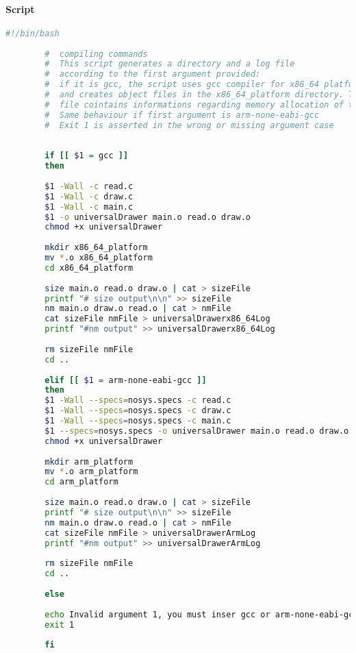 \documentclass{article}
\begin{document}
		\paragraph{Script}
		\begin{center}
		\begin{lstlisting}[language=bash, basicstyle=\small]
		#!/bin/bash
		
		#  compiling commands
		#  This script generates a directory and a log file
		#  according to the first argument provided:
		#  if it is gcc, the script uses gcc compiler for x86_64 platforms
		#  and creates object files in the x86_64_platform directory. The log
		#  file cointains informations regarding memory allocation of the code
		#  Same behaviour if first argument is arm-none-eabi-gcc
		#  Exit 1 is asserted in the wrong or missing argument case
		
		
		if [[ $1 = gcc ]]
		then
		
		$1 -Wall -c read.c 
		$1 -Wall -c draw.c 
		$1 -Wall -c main.c
		$1 -o universalDrawer main.o read.o draw.o
		chmod +x universalDrawer
		
		mkdir x86_64_platform
		mv *.o x86_64_platform
		cd x86_64_platform
		
		size main.o read.o draw.o | cat > sizeFile 
		printf "# size output\n\n" >> sizeFile
		nm main.o draw.o read.o | cat > nmFile
		cat sizeFile nmFile > universalDrawerx86_64Log
		printf "#nm output" >> universalDrawerx86_64Log
		
		rm sizeFile nmFile
		cd ..
		
		elif [[ $1 = arm-none-eabi-gcc ]]
		then
		$1 -Wall --specs=nosys.specs -c read.c 
		$1 -Wall --specs=nosys.specs -c draw.c 
		$1 -Wall --specs=nosys.specs -c main.c
		$1 --specs=nosys.specs -o universalDrawer main.o read.o draw.o
		chmod +x universalDrawer
		
		mkdir arm_platform
		mv *.o arm_platform
		cd arm_platform
		
		size main.o read.o draw.o | cat > sizeFile 
		printf "# size output\n\n" >> sizeFile
		nm main.o draw.o read.o | cat > nmFile
		cat sizeFile nmFile > universalDrawerArmLog
		printf "#nm output" >> universalDrawerArmLog
		
		rm sizeFile nmFile
		cd ..
		
		else
		
		echo Invalid argument 1, you must inser gcc or arm-none-eabi-gcc
		exit 1
		
		fi
		\end{lstlisting}
		\end{center}
\end{document}
